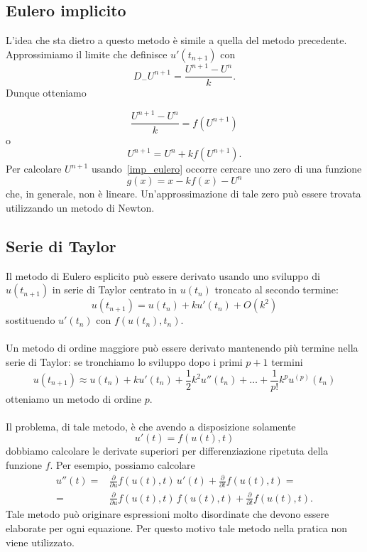 \subsection{Eulero implicito }
L'idea che sta dietro a questo metodo \`e simile a quella del metodo precedente.\\
Approssimiamo il limite che definisce $u'\left(t_{n+1}\right)$ con
$$ D_{-}U^{n+1} = \frac{ U^{n+1}-U^n}{k}.$$ 
Dunque otteniamo 

$$ \frac{ U^{n+1}-U^n}{k} = f\left(U^{n+1}\right)$$ 
o 
\begin{equation}
	 U^{n+1} = U^n + k f\left(U^{n+1}\right).
	 \label{imp_eulero}
\end{equation}
Per calcolare $U^{n+1}$ usando~\eqref{imp_eulero} occorre cercare uno zero di una funzione 
$$ g(x) = x - kf(x) - U^n$$ 
che, in generale, non \`e lineare. Un'approssimazione di tale  zero pu\`o essere trovata utilizzando un metodo di Newton.
\subsection{Serie di Taylor}
Il metodo di Eulero esplicito pu\`o essere derivato usando uno sviluppo di $u\left(t_{n+1}\right)$ in serie di Taylor  centrato in $u\left(t_n\right)$ troncato al secondo termine:
$$ u\left(t_{n+1}\right) = u(t_n) + k u'\left(t_n\right) + O\left(k^2\right)$$ 
sostituendo $u'\left(t_n\right)$ con $f\left(u\left(t_n\right),t_n\right)$.\\ \\
Un metodo di ordine maggiore pu\`o essere derivato mantenendo pi\`u termine nella serie di Taylor: se tronchiamo lo sviluppo dopo i primi $p+1$ termini
$$ u\left(t_{n+1}\right) \approx u\left(t_{n}\right) + ku'\left(t_{n}\right) + \frac{1}{2} k^2 u''\left(t_{n}\right) + \dots + \frac{1}{p!}k^p u^{(p)}\left(t_{n}\right)$$ 
otteniamo un metodo di ordine $p$.\\ \\

Il problema, di tale metodo, \`e che avendo a disposizione solamente
$$ u'(t) = f(u(t),t)$$
 dobbiamo calcolare le derivate superiori per differenziazione ripetuta della funzione $f$. Per esempio, possiamo calcolare 
\begin{equation*}
\label{der2}
	\begin{aligned}
	u''(t) =&\frac{\partial}{\partial u} f\left(u(t),t\right) \, u'(t) + 	\frac{\partial}{\partial t} f\left(u(t),t\right) =\\
	=& \frac{\partial}{\partial u} f\left(u(t),t\right) \, f\left(u(t),t\right) + \frac{\partial}{\partial t} f\left(u(t),t\right).\end{aligned}
\end{equation*}
Tale metodo pu\`o originare espressioni molto disordinate che devono essere elaborate per ogni equazione.  Per questo motivo tale metodo nella pratica non viene utilizzato.
